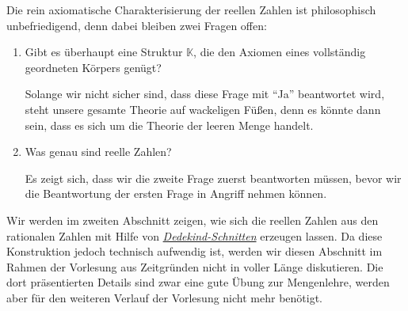 Die rein axiomatische Charakterisierung der
reellen Zahlen ist philosophisch unbefriedigend, denn dabei bleiben zwei Fragen offen:
\begin{enumerate}
\item Gibt es \"uberhaupt eine Struktur $\mathbb{K}$, die den Axiomen eines vollst\"andig geordneten
      K\"orpers gen\"ugt?

      Solange wir nicht sicher sind, dass diese Frage mit ``Ja'' beantwortet wird, steht unsere
      gesamte Theorie auf wackeligen F\"u\ss{}en, denn es k\"onnte dann sein, dass es sich um die Theorie
      der leeren Menge handelt. 
\item Was genau sind reelle Zahlen?

      Es zeigt sich, dass wir die zweite Frage zuerst beantworten m\"ussen, bevor wir die Beantwortung
      der ersten Frage in Angriff nehmen k\"onnen. 
\end{enumerate}
Wir werden im zweiten Abschnitt zeigen, wie sich die reellen Zahlen aus den rationalen Zahlen mit
Hilfe von \href{https://de.wikipedia.org/wiki/Dedekindscher_Schnitt}{\emph{Dedekind-Schnitten}}
erzeugen lassen.  Da diese Konstruktion jedoch technisch aufwendig ist, werden wir diesen Abschnitt
im Rahmen der Vorlesung aus Zeitgr\"unden nicht in voller L\"ange diskutieren.  Die dort
pr\"asentierten Details sind zwar eine gute \"Ubung zur Mengenlehre,  werden aber f\"ur den weiteren
Verlauf der Vorlesung nicht mehr ben\"otigt.



